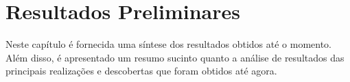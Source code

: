 \section{Resultados Preliminares} \label{sec:result}

Neste capítulo é fornecida uma síntese dos resultados obtidos até o momento. Além disso, é apresentado um resumo sucinto quanto a análise de resultados das principais realizações e descobertas que foram obtidos até agora.






















  

 
